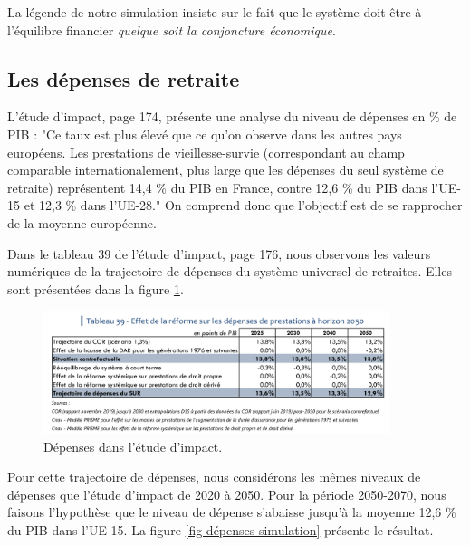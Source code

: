 \documentclass[10pt]{article}
\begin{document}
La légende de notre simulation insiste sur le fait que 
le système doit être à l'équilibre financier \emph{quelque soit la 
conjoncture économique}. 


\subsection{Les dépenses de retraite}

L'étude d'impact, page 174, présente une analyse du niveau de dépenses 
en \% de PIB : "Ce taux est plus élevé que ce qu’on observe dans 
les autres pays européens. Les prestations de vieillesse-survie 
(correspondant au champ comparable internationalement, plus 
large que les dépenses du seul système de retraite) représentent 
14,4 \% du PIB en France, contre 12,6 \% du PIB dans l’UE-15 et 12,3 \% dans l’UE-28."
On comprend donc que l'objectif est de se rapprocher de la moyenne européenne. 

Dans le tableau 39 de l'étude d'impact, page 176, nous observons les valeurs numériques de la trajectoire de dépenses du système universel de retraites. 
Elles sont présentées dans la figure \ref{fig-depenses-etude-impact}.

\begin{figure}
\begin{center}
\includegraphics[width=0.9\textwidth]{EtudeImpact-Depenses-SUR.png}
\end{center}
\caption{Dépenses dans l'étude d'impact.}
\label{fig-depenses-etude-impact}
\end{figure}

Pour cette trajectoire de dépenses, nous considérons les mêmes 
niveaux de dépenses que l'étude d'impact de 2020 à 2050. 
Pour la période 2050-2070, nous faisons l'hypothèse que le niveau 
de dépense s'abaisse jusqu'à la moyenne 12,6 \% du PIB dans l’UE-15. 
La figure \ref{fig-dépenses-simulation} présente le résultat. 
\end{document}
